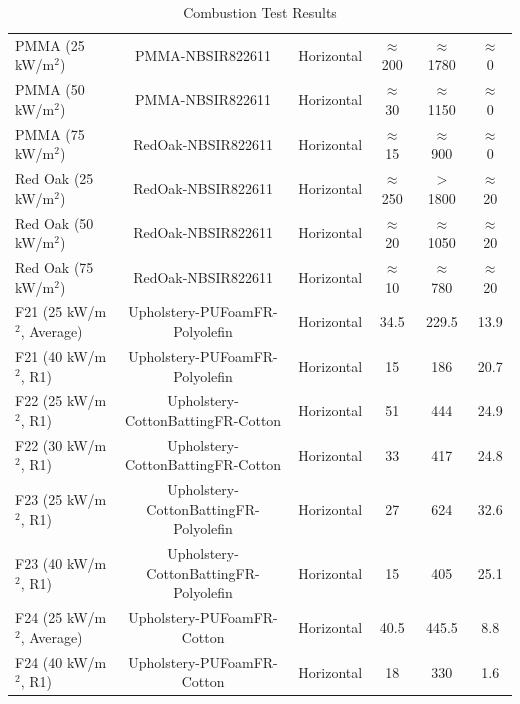 \documentclass{abstract}
\begin{document}
\begin{table}[H]
    \centering
    \caption{Combustion Test Results}
    \label{tab:combustion_results}
    \begin{tabularx}{\textwidth}{|L|c|c|c|c|c|}
    	\hline
    	 &  &  &  &  &  \\
    	\hline
    	PMMA (25 kW/m$^2$) & PMMA-NBSIR822611 & Horizontal & $\approx$ 200 & $\approx$ 1780 & $\approx$ 0 \\
    	\hline
    	PMMA (50 kW/m$^2$) & PMMA-NBSIR822611 & Horizontal & $\approx$ 30 & $\approx$ 1150 & $\approx$ 0 \\
    	\hline
    	PMMA (75 kW/m$^2$) & RedOak-NBSIR822611 & Horizontal & $\approx$ 15 & $\approx$ 900 & $\approx$ 0 \\
    	\hline
    	Red Oak (25 kW/m$^2$) & RedOak-NBSIR822611 & Horizontal & $\approx$ 250 & $>$ 1800 & $\approx$ 20 \\
    	\hline
    	Red Oak (50 kW/m$^2$) & RedOak-NBSIR822611 & Horizontal & $\approx$ 20 & $\approx$ 1050 & $\approx$ 20 \\
    	\hline
    	Red Oak (75 kW/m$^2$) & RedOak-NBSIR822611 & Horizontal & $\approx$ 10 & $\approx$ 780 & $\approx$ 20 \\
    	\hline
    	F21 (25 kW/m$^2$, Average) & Upholstery-PUFoamFR-Polyolefin & Horizontal & 34.5 & 229.5 & 13.9 \\
    	\hline
    	F21 (40 kW/m$^2$, R1) & Upholstery-PUFoamFR-Polyolefin & Horizontal & 15 & 186 & 20.7 \\
    	\hline
    	F22 (25 kW/m$^2$, R1) & Upholstery-CottonBattingFR-Cotton & Horizontal & 51 & 444 & 24.9 \\
    	\hline
    	F22 (30 kW/m$^2$, R1) & Upholstery-CottonBattingFR-Cotton & Horizontal & 33 & 417 & 24.8 \\
    	\hline
    	F23 (25 kW/m$^2$, R1) & Upholstery-CottonBattingFR-Polyolefin & Horizontal & 27 & 624 & 32.6 \\
    	\hline
    	F23 (40 kW/m$^2$, R1) & Upholstery-CottonBattingFR-Polyolefin & Horizontal & 15 & 405 & 25.1 \\
    	\hline
    	F24 (25 kW/m$^2$, Average) & Upholstery-PUFoamFR-Cotton & Horizontal & 40.5 & 445.5 & 8.8 \\
    	\hline
    	F24 (40 kW/m$^2$, R1) & Upholstery-PUFoamFR-Cotton & Horizontal & 18 & 330 & 1.6 \\

\end{tabularx}
\end{table}
\end{document}
